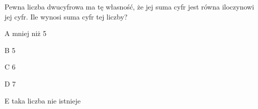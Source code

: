 \begin{tresc}
Pewna liczba dwucyfrowa ma tę własność, że jej suma cyfr jest równa iloczynowi jej cyfr. Ile wynosi suma cyfr tej liczby?
\end{tresc}
\begin{wariant}{A} mniej niż 5 \end{wariant}
\begin{wariant}{B} 5 \end{wariant}
\begin{wariant}{C} 6 \end{wariant}
\begin{wariant}{D} 7 \end{wariant}
\begin{wariant}{E} taka liczba nie istnieje \end{wariant}
